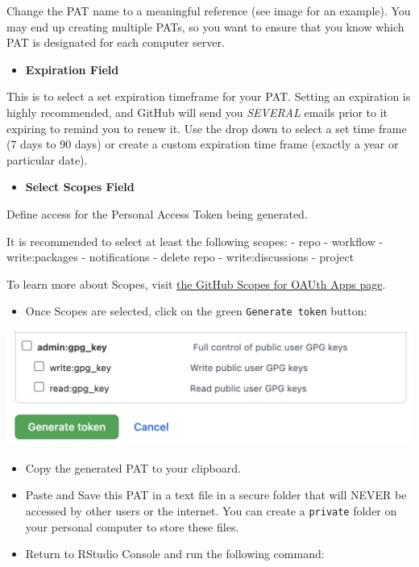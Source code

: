 \documentclass[
]{book}
\providecommand{\tightlist}{%
  \setlength{\itemsep}{0pt}\setlength{\parskip}{0pt}}
\begin{document}
Change the PAT name to a meaningful reference (see image for an example). You may end up creating multiple PATs, so you want to ensure that you know which PAT is designated for each computer \textbar{} server.

\begin{itemize}
\tightlist
\item
  \textbf{Expiration Field}
\end{itemize}

This is to select a set expiration timeframe for your PAT. Setting an expiration is highly recommended, and GitHub will send you \emph{SEVERAL} emails prior to it expiring to remind you to renew it. Use the drop down to select a set time frame (7 days to 90 days) or create a custom expiration time frame (exactly a year or particular date).

\begin{itemize}
\tightlist
\item
  \textbf{Select Scopes Field}
\end{itemize}

Define access for the Personal Access Token being generated.

It is recommended to select at least the following scopes:
- repo
- workflow
- write:packages
- notifications
- delete repo
- write:discussions
- project

To learn more about Scopes, visit \href{https://docs.github.com/en/developers/apps/building-oauth-apps/scopes-for-oauth-apps}{the GitHub Scopes for OAUth Apps page}.

\begin{itemize}
\tightlist
\item
  Once Scopes are selected, click on the green \texttt{Generate\ token} button:
\end{itemize}

\begin{center}\includegraphics{images/generatepat} \end{center}

\begin{itemize}
\item
  Copy the generated PAT to your clipboard.
\item
  Paste and Save this PAT in a text file in a secure folder that will NEVER be accessed by other users or the internet. You can create a \texttt{private} folder on your personal computer to store these files.
\item
  Return to RStudio Console and run the following command:
\end{itemize}
\end{document}

